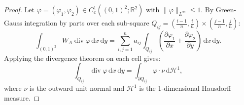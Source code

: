 \documentclass[11pt,a4paper,reqno]{amsart}
\theoremstyle{definition}
\numberwithin{equation}{section}
\newcommand{\R}{\mathbb{R}}
\newcommand{\dif}{\,\mathrm{d}}
\begin{document}
\begin{proof}
Let $\varphi = (\varphi_1, \varphi_2) \in C_c^1((0,1)^2; \R^2)$ with $\|\varphi\|_{L^\infty} \le 1$. By Green-Gauss integration by parts over each sub-square $Q_{ij} = (\frac{i-1}{n}, \frac{i}{n}) \times (\frac{j-1}{n}, \frac{j}{n})$:
\begin{equation}
    \int_{(0,1)^2} W_A \operatorname{div} \varphi \dif x \dif y = \sum_{i,j=1}^n a_{ij} \int_{Q_{ij}} \left( \frac{\partial \varphi_1}{\partial x} + \frac{\partial \varphi_2}{\partial y} \right) \dif x \dif y.
\end{equation}
Applying the divergence theorem on each cell gives:
\begin{equation}
    \int_{Q_{ij}} \operatorname{div}\varphi \dif x \dif y = \int_{\partial Q_{ij}} \varphi \cdot \nu \dif \mathcal{H}^1,
\end{equation}
where $\nu$ is the outward unit normal and $\mathcal{H}^1$ is the 1-dimensional Hausdorff measure. 


\end{proof}
\end{document}
